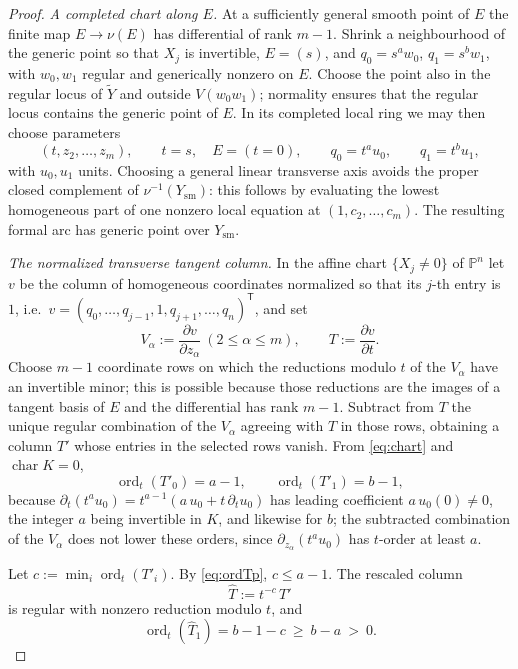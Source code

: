 \documentclass[11pt]{article}
\theoremstyle{plain}
\theoremstyle{definition}
\theoremstyle{remark}
\theoremstyle{plain}
\newcommand{\ord}{\operatorname{ord}}
\newcommand{\sm}{\mathrm{sm}}
\newcommand{\bbP}{\mathbb{P}}
\begin{document}
\begin{proof}
\emph{A completed chart along $E$.} At a sufficiently general smooth point of
$E$ the finite map $E\to\nu(E)$ has differential of rank $m-1$. Shrink a
neighbourhood of the generic point so that $X_j$ is invertible, $E=(s)$, and
$q_0=s^aw_0$, $q_1=s^bw_1$, with $w_0,w_1$ regular and generically nonzero on
$E$. Choose the point also in the regular locus of $\widetilde Y$ and outside
$V(w_0w_1)$; normality ensures that the regular locus contains the generic
point of $E$. In its completed local ring we may then choose parameters
\begin{equation}\label{eq:chart}
  (t,z_2,\dots,z_m),\qquad t=s,\quad E=(t=0),\qquad
  q_0=t^{a}u_0,\qquad q_1=t^{b}u_1,
\end{equation}
with $u_0,u_1$ units. Choosing a general linear transverse axis avoids the
proper closed complement of $\nu^{-1}(Y_{\sm})$: this follows by evaluating
the lowest homogeneous part of one nonzero local equation at
$(1,c_2,\ldots,c_m)$. The resulting formal arc has generic point over
$Y_{\sm}$.

\emph{The normalized transverse tangent column.} In the affine chart
$\{X_j\neq0\}$ of $\bbP^n$ let $v$ be the column of homogeneous coordinates
normalized so that its $j$-th entry is $1$, i.e.\
$v=(q_0,\dots,q_{j-1},1,q_{j+1},\dots,q_n)^{\mathsf T}$, and set
\[
  V_\alpha:=\frac{\partial v}{\partial z_\alpha}\ (2\le\alpha\le m),
  \qquad
  T:=\frac{\partial v}{\partial t}.
\]
Choose $m-1$ coordinate rows on which the reductions modulo $t$ of the
$V_\alpha$ have an invertible minor; this is possible because those reductions
are the images of a tangent basis of $E$ and the differential has rank $m-1$.
Subtract from $T$ the unique regular combination of the $V_\alpha$ agreeing with $T$ in those
rows, obtaining a column $T'$ whose entries in the selected rows vanish. From
\eqref{eq:chart} and $\operatorname{char}K=0$,
\begin{equation}\label{eq:ordTp}
  \ord_t(T'_0)=a-1,\qquad \ord_t(T'_1)=b-1,
\end{equation}
because $\partial_t(t^{a}u_0)=t^{a-1}(a\,u_0+t\,\partial_tu_0)$ has leading
coefficient $a\,u_0(0)\neq0$, the integer $a$ being invertible in $K$, and
likewise for $b$; the subtracted combination of the $V_\alpha$ does not lower
these orders, since $\partial_{z_\alpha}(t^{a}u_0)$ has $t$-order at least $a$.

Let $c:=\min_i\ord_t(T'_i)$. By \eqref{eq:ordTp}, $c\le a-1$. The rescaled
column
\[
  \widehat T:=t^{-c}\,T'
\]
is regular with nonzero reduction modulo $t$, and
\begin{equation}\label{eq:That1}
  \ord_t(\widehat T_1)=b-1-c\ \ge\ b-a\ >\ 0 .
\end{equation}


\end{proof}
\end{document}
